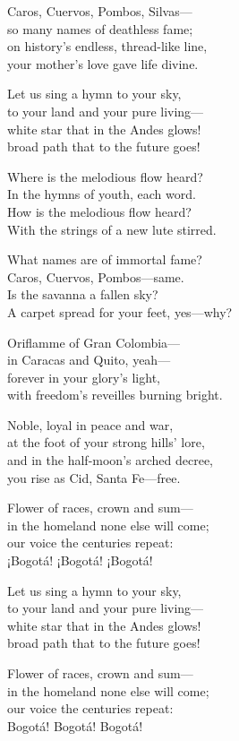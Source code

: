 \begin{lyrics}
Caros, Cuervos, Pombos, Silvas—\\
so many names of deathless fame;\\
on history’s endless, thread-like line,\\
your mother’s love gave life divine.

Let us sing a hymn to your sky,\\
to your land and your pure living—\\
white star that in the Andes glows!\\
broad path that to the future goes!

 Where is the melodious flow heard?\\
 In the hymns of youth, each word.\\
 How is the melodious flow heard?\\
 With the strings of a new lute stirred.

 What names are of immortal fame?\\
 Caros, Cuervos, Pombos—same.\\
 Is the savanna a fallen sky?\\
 A carpet spread for your feet, yes—why?

Oriflamme of Gran Colombia—\\
in Caracas and Quito, yeah—\\
forever in your glory’s light,\\
with freedom’s reveilles burning bright.

Noble, loyal in peace and war,\\
at the foot of your strong hills’ lore,\\
and in the half-moon’s arched decree,\\
you rise as Cid, Santa Fe—free.

Flower of races, crown and sum—\\
in the homeland none else will come;\\
our voice the centuries repeat:\\
¡Bogotá! ¡Bogotá! ¡Bogotá!

Let us sing a hymn to your sky,\\
to your land and your pure living—\\
white star that in the Andes glows!\\
broad path that to the future goes!

Flower of races, crown and sum—\\
in the homeland none else will come;\\
our voice the centuries repeat:\\
Bogotá! Bogotá! Bogotá!
\end{lyrics}

